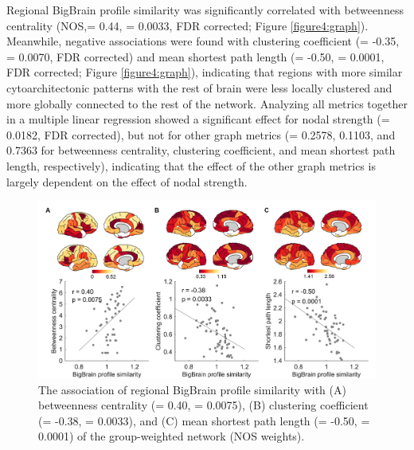 \begin{refsection}
Regional BigBrain profile similarity was significantly correlated with betweenness centrality (NOS,\rval = 0.44, \pval = 0.0033, FDR corrected; Figure \ref{figure4:graph}). Meanwhile, negative associations were found with clustering coefficient (\rval = -0.35, \pval = 0.0070, FDR corrected) and mean shortest path length (\rval = -0.50, \pval = 0.0001, FDR corrected; Figure \ref{figure4:graph}), indicating that regions with more similar cytoarchitectonic patterns with the rest of brain were less locally clustered and more globally connected to the rest of the network. Analyzing all metrics together in a multiple linear regression showed a significant effect for nodal strength (\pval = 0.0182, FDR corrected), but not for other graph metrics (\pval = 0.2578, 0.1103, and 0.7363 for betweenness centrality, clustering coefficient, and mean shortest path length, respectively), indicating that the effect of the other graph metrics is largely dependent on the effect of nodal strength.

\begin{figure}[h]
    \centering
    \includegraphics[width=\linewidth]{images/thesis_bb_fig6.jpg}
    \caption{The association of regional BigBrain profile similarity with (A) betweenness centrality (\rval = 0.40, \pval = 0.0075), (B) clustering coefficient (\rval = -0.38, \pval = 0.0033), and (C) mean shortest path length (\rval = -0.50, \pval = 0.0001) of the group-weighted network (NOS weights).}
    \label{bigbrainFig6}
\end{figure}



\end{refsection}
